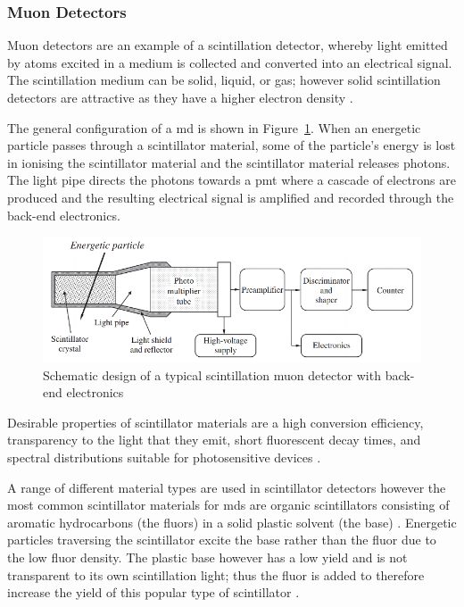 \subsubsection*{Muon Detectors}

Muon detectors are an example of a scintillation detector, whereby light emitted by atoms excited in a medium is collected and converted into an electrical signal. The scintillation medium can be solid, liquid, or gas; however solid scintillation detectors are attractive as they have a higher electron density \citep{gloeckler_-situ_2010}.

The general configuration of a \gls{md} is shown in Figure~\ref{fig:MD}. When an energetic particle passes through a scintillator material, some of the particle's energy is lost in ionising the scintillator material and the scintillator material releases photons. The light pipe directs the photons towards a \gls{pmt} where a cascade of electrons are produced and the resulting electrical signal is amplified and recorded through the back-end electronics.

\begin{figure}[ht]
	\centering
	\includegraphics[width=0.7\columnwidth]{scintillator_rescaled.png}
	\caption{Schematic design of a typical scintillation muon detector with back-end electronics \citep{gloeckler_-situ_2010}}
	\label{fig:MD}
\end{figure}

Desirable properties of scintillator materials are a high conversion efficiency, transparency to the light that they emit, short fluorescent decay times, and spectral distributions suitable for photosensitive devices \citep{gloeckler_-situ_2010}. 

A range of different material types are used in scintillator detectors however the most common scintillator materials for \glspl{md} are organic scintillators consisting of aromatic hydrocarbons (the fluors) in a solid plastic solvent (the base) \citep{gloeckler_-situ_2010, fokkema_hisparc_2012}. Energetic particles traversing the scintillator excite the base rather than the fluor due to the low fluor density. The plastic base however has a low yield and is not transparent to its own scintillation light; thus the fluor is added to therefore increase the yield of this popular type of scintillator \citep{fokkema_hisparc_2012}.





